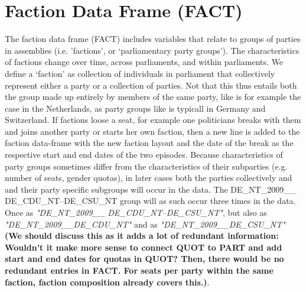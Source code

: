 \documentclass{article}
\begin{document}
\section{Faction Data Frame (\gls{FACT})}\label{FACT}
The faction data frame (\gls{FACT}) includes variables that relate to groups of parties in assemblies (i.e. 'factions', or `parliamentary party groups'). The characteristics of factions change over time, across parliaments, and within parliaments. We define a  `faction' as collection of individuals in parliament that collectively represent either a party or a collection of parties. Not that this thus entails both the group made up entirely by members of the same party, like is for example the case in the Netherlands, as party groups like is typicall in Germany and Switzerland. If factions loose a seat, for example one politicians breaks with them and joins another party or starts her own faction, then a new line is added to the faction data-frame with the new faction layout and the date of the break as the respective start and end dates of the two episodes. Because characteristics of party groups sometimes differ from the characteristics of their subparties (e.g. number of seats, gender quotas), in later cases both the parties collectively and and their party specific subgroups will occur in the data. The DE\_NT\_2009\_\_ DE\_CDU\_NT--DE\_CSU\_NT group will as such occur three times in the data. Once as \textit{"DE\_NT\_2009\_\_ DE\_CDU\_NT--DE\_CSU\_NT"}, but also as \textit{"DE\_NT\_2009\_\_DE\_CDU\_NT"} and as \textit{"DE\_NT\_2009\_\_DE\_CSU\_NT"} \textbf{\color{red}(We should discuss this as it adds a lot of redundant information: Wouldn't it make more sense to connect QUOT to PART and add start and end dates for quotas in QUOT? Then, there would be no redundant entries in FACT. For seats per party within the same faction, faction composition already covers this.)}. 


\end{document}
